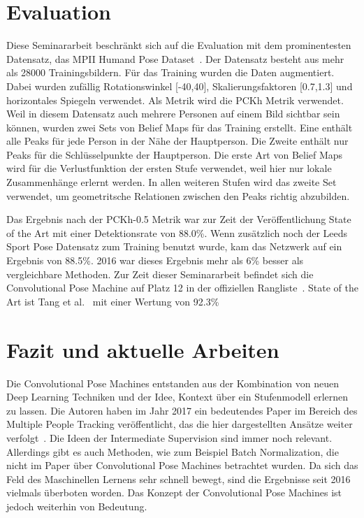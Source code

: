 \documentclass[journal, a4paper]{IEEEtran}
\begin{document}
\section{Evaluation}

        Diese Seminararbeit beschränkt sich auf die Evaluation mit dem prominentesten Datensatz, das MPII Humand Pose Dataset~\cite{MPII}. Der Datensatz besteht aus mehr als 28000 Trainingsbildern. Für das Training wurden die Daten augmentiert. Dabei wurden zufällig Rotationswinkel [-40\degree,40\degree], Skalierungsfaktoren [0.7,1.3] und horizontales Spiegeln verwendet. Als Metrik wird die PCKh Metrik verwendet. %
        Weil in diesem Datensatz auch mehrere Personen auf einem Bild sichtbar sein können, wurden zwei Sets von Belief Maps für das Training erstellt. Eine enthält alle Peaks für jede Person in der Nähe der Hauptperson. Die Zweite enthält nur Peaks für die Schlüsselpunkte der Hauptperson.
        Die erste Art von Belief Maps wird für die Verlustfunktion der ersten Stufe verwendet, weil hier nur lokale Zusammenhänge erlernt werden. In allen weiteren Stufen wird das zweite Set verwendet, um geometritsche Relationen zwischen den Peaks richtig abzubilden.

        Das Ergebnis nach der PCKh-0.5 Metrik war zur Zeit der Veröffentlichung State of the Art mit einer Detektionsrate von 88.0\%. Wenn zusätzlich noch der Leeds Sport Pose Datensatz zum Training benutzt wurde, kam das Netzwerk auf ein Ergebnis von 88.5\%. 2016 war dieses Ergebnis mehr als 6\% besser als vergleichbare Methoden. Zur Zeit dieser Seminararbeit befindet sich die Convolutional Pose Machine auf Platz 12 in der offiziellen Rangliste~\cite{MPII}. State of the Art ist Tang et al.~\cite{tang2018deeply} mit einer Wertung von 92.3\%
        
\section{Fazit und aktuelle Arbeiten}
        Die Convolutional Pose Machines entstanden aus der Kombination von neuen Deep Learning Techniken und der Idee, Kontext über ein Stufenmodell erlernen zu lassen. Die Autoren haben im Jahr 2017 ein bedeutendes Paper im Bereich des Multiple People Tracking veröffentlicht, das die hier dargestellten Ansätze weiter verfolgt~\cite{cao2017realtime,wei2016cpm}. Die Ideen der Intermediate Supervision sind immer noch relevant. Allerdings gibt es auch Methoden, wie zum Beispiel Batch Normalization, die nicht im Paper über Convolutional Pose Machines betrachtet wurden. Da sich das Feld des Maschinellen Lernens sehr schnell bewegt, sind die Ergebnisse seit 2016 vielmals überboten worden. Das Konzept der Convolutional Pose Machines ist jedoch weiterhin von Bedeutung.



\renewcommand\bibname{Literatur}

\end{document}
